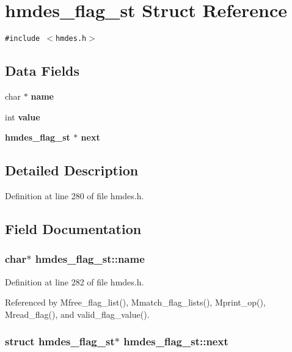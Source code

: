 \section{hmdes\_\-flag\_\-st Struct Reference}
\label{structhmdes__flag__st}
{\tt \#include $<$hmdes.h$>$}

\subsection*{Data Fields}
\begin{CompactItemize}
\item 
char $\ast$ \bf{name}
\item 
int \bf{value}
\item 
\bf{hmdes\_\-flag\_\-st} $\ast$ \bf{next}
\end{CompactItemize}


\subsection{Detailed Description}




Definition at line 280 of file hmdes.h.

\subsection{Field Documentation}
\subsubsection{\setlength{\rightskip}{0pt plus 5cm}char$\ast$ \bf{hmdes\_\-flag\_\-st::name}}\label{structhmdes__flag__st_b25f2d4a0cd5b8252470d004e0a8c296}




Definition at line 282 of file hmdes.h.

Referenced by Mfree\_\-flag\_\-list(), Mmatch\_\-flag\_\-lists(), Mprint\_\-op(), Mread\_\-flag(), and valid\_\-flag\_\-value().
\subsubsection{\setlength{\rightskip}{0pt plus 5cm}struct \bf{hmdes\_\-flag\_\-st}$\ast$ \bf{hmdes\_\-flag\_\-st::next}}\label{structhmdes__flag__st_aa41ef0173585f7ef4e4f385e13b0e02}




